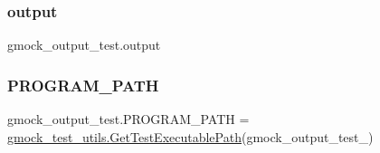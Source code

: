\subsubsection{\texorpdfstring{output}{output}}
{\footnotesize\ttfamily gmock\+\_\+output\+\_\+test.\+output}

\mbox{\label{namespacegmock__output__test_a03aac0fac952a0b3648340f529af7f59}} 
\subsubsection{\texorpdfstring{PROGRAM\_PATH}{PROGRAM\_PATH}}
{\footnotesize\ttfamily gmock\+\_\+output\+\_\+test.\+P\+R\+O\+G\+R\+A\+M\+\_\+\+P\+A\+TH = \mbox{\hyperlink{namespacegmock__test__utils_aadd2927024e24f0c53f7ba283402cdb1}{gmock\+\_\+test\+\_\+utils.\+Get\+Test\+Executable\+Path}}(\textquotesingle{}gmock\+\_\+output\+\_\+test\+\_\+\textquotesingle{})}

